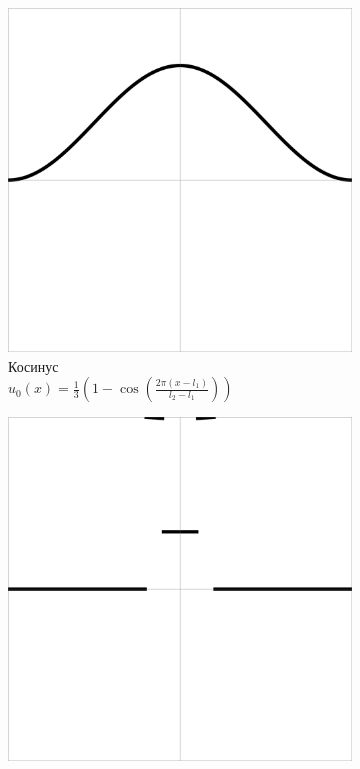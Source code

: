 \documentclass[12pt, a4paper]{article}
\begin{document}
\begin{figure}[!hp]
	\begin{subfigure}[t]{0.475\textwidth}
		\centering
		\includegraphics[width=\textwidth]{test4}
		\caption{Косинус \\ $u_0(x) = \frac{1}{3} (1 - \cos(\frac{2 \pi (x - l_1)}{l_2 - l_1}))$}
		\label{test4}
	\end{subfigure}
	\hfill
	\begin{subfigure}[t]{0.475\textwidth}
		\centering
		\includegraphics[width=\textwidth]{test5}

\end{subfigure}
\end{figure}
\end{document}
